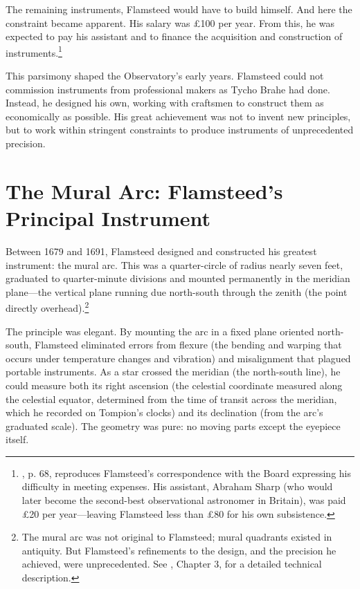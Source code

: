 The remaining instruments, Flamsteed would have to build himself. And here the constraint became apparent. His salary was \pounds100 per year. From this, he was expected to pay his assistant and to finance the acquisition and construction of instruments.\footnote{\textcite{Baily1835}, p. 68, reproduces Flamsteed's correspondence with the Board expressing his difficulty in meeting expenses. His assistant, Abraham Sharp (who would later become the second-best observational astronomer in Britain), was paid \pounds20 per year---leaving Flamsteed less than \pounds80 for his own subsistence.}

This parsimony shaped the Observatory's early years. Flamsteed could not commission instruments from professional makers as Tycho Brahe had done. Instead, he designed his own, working with craftsmen to construct them as economically as possible. His great achievement was not to invent new principles, but to work within stringent constraints to produce instruments of unprecedented precision.

\section{The Mural Arc: Flamsteed's Principal Instrument}
\label{sec:mural-arc}

Between 1679 and 1691, Flamsteed designed and constructed his greatest instrument: the mural arc. This was a quarter-circle of radius nearly seven feet, graduated to quarter-minute divisions and mounted permanently in the meridian plane---the vertical plane running due north-south through the zenith (the point directly overhead).\footnote{The mural arc was not original to Flamsteed; mural quadrants existed in antiquity. But Flamsteed's refinements to the design, and the precision he achieved, were unprecedented. See \textcite{Howse1980}, Chapter 3, for a detailed technical description.}

The principle was elegant. By mounting the arc in a fixed plane oriented north-south, Flamsteed eliminated errors from flexure (the bending and warping that occurs under temperature changes and vibration) and misalignment that plagued portable instruments. As a star crossed the meridian (the north-south line), he could measure both its right ascension (the celestial coordinate measured along the celestial equator, determined from the time of transit across the meridian, which he recorded on Tompion's clocks) and its declination (from the arc's graduated scale). The geometry was pure: no moving parts except the eyepiece itself.

